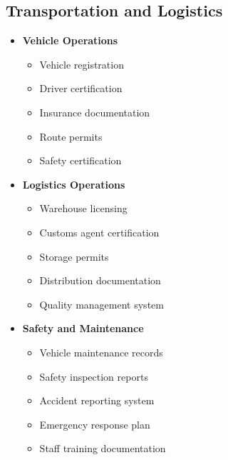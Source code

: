 \subsection{Transportation and Logistics}\label{subsec:transportation-compliance}
\vspace{1em}

\begin{tcolorbox}[
    colback=white,
    colframe=primarydark,
    title=\textbf{Transportation Sector Requirements},
    before skip=1em,
    after skip=1em
]
    \begin{itemize}[leftmargin=*,itemsep=0.5em]
        \item \textbf{Vehicle Operations}
        \begin{itemize}[itemsep=0.3em]
            \item Vehicle registration
            \item Driver certification
            \item Insurance documentation
            \item Route permits
            \item Safety certification
        \end{itemize}

        \vspace{0.5em}

        \item \textbf{Logistics Operations}
        \begin{itemize}[itemsep=0.3em]
            \item Warehouse licensing
            \item Customs agent certification
            \item Storage permits
            \item Distribution documentation
            \item Quality management system
        \end{itemize}

        \vspace{0.5em}

        \item \textbf{Safety and Maintenance}
        \begin{itemize}[itemsep=0.3em]
            \item Vehicle maintenance records
            \item Safety inspection reports
            \item Accident reporting system
            \item Emergency response plan
            \item Staff training documentation
        \end{itemize}
    \end{itemize}
\end{tcolorbox}

